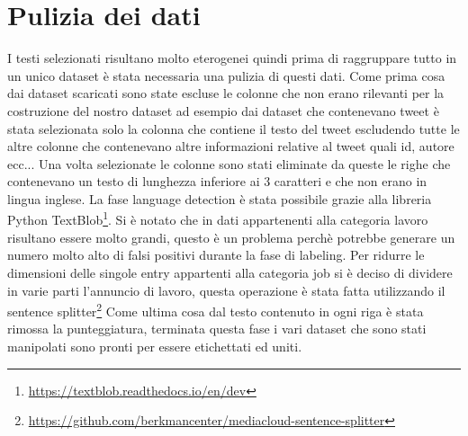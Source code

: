 \section{Pulizia dei dati}
I testi selezionati risultano molto eterogenei quindi prima di raggruppare tutto in un unico dataset è stata necessaria una pulizia di questi dati.\newline
Come prima cosa dai dataset scaricati sono state escluse le colonne che non erano rilevanti per la costruzione del nostro dataset ad esempio dai dataset che contenevano tweet è stata selezionata solo la colonna che contiene il testo del tweet escludendo tutte le altre colonne che contenevano altre informazioni relative al tweet quali id, autore ecc...\newline
Una volta selezionate le colonne sono stati eliminate da queste le righe che contenevano un testo di lunghezza inferiore ai 3 caratteri e che non erano in lingua inglese. La fase language detection è stata possibile grazie alla libreria Python  TextBlob\footnote{\url{https://textblob.readthedocs.io/en/dev}}.\newline
Si è notato che in dati appartenenti alla categoria lavoro risultano essere molto grandi, questo è un problema perchè potrebbe generare un numero molto alto di falsi positivi durante la fase di labeling. Per ridurre le dimensioni delle singole entry appartenti alla categoria job si è deciso di dividere in varie parti l'annuncio di lavoro, questa operazione è stata fatta utilizzando il sentence splitter\footnote{\url{https://github.com/berkmancenter/mediacloud-sentence-splitter}} \newline
Come ultima cosa dal testo contenuto in ogni riga è stata rimossa la punteggiatura, terminata questa fase i vari dataset che sono stati manipolati sono pronti per essere etichettati ed uniti. 
